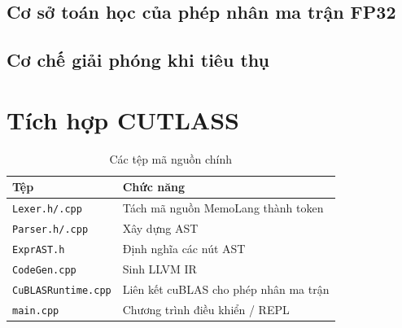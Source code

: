 \documentclass[a4paper]{article}
\begin{document}
	\subsection{Cơ sở toán học của phép nhân ma trận FP32}
	
	
	\subsection{Cơ chế giải phóng khi tiêu thụ}
	
	
	\section{Tích hợp CUTLASS}
	
	
	\begin{table}[h]
		\centering
		\caption{Các tệp mã nguồn chính}
		\label{tab:modules}
		\begin{tabular}{ll}
			\toprule
			Tệp & Chức năng \\
			\midrule
			\texttt{Lexer.h/.cpp} & Tách mã nguồn MemoLang thành token \\
			\texttt{Parser.h/.cpp} & Xây dựng AST \\
			\texttt{ExprAST.h} & Định nghĩa các nút AST \\
			\texttt{CodeGen.cpp} & Sinh LLVM IR \\
			\texttt{CuBLASRuntime.cpp} & Liên kết cuBLAS cho phép nhân ma trận \\
			\texttt{main.cpp} & Chương trình điều khiển / REPL \\
			\bottomrule
		\end{tabular}
	\end{table}
	
	
\end{document}
